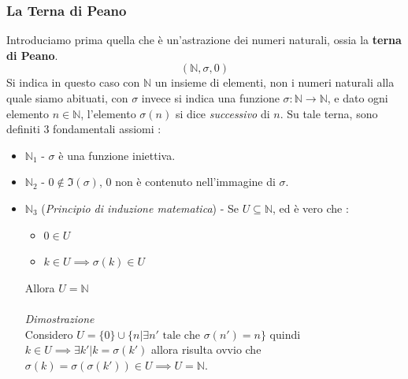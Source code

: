 \documentclass[12pt, letterpaper]{article}
\begin{document}
\subsubsection{La Terna di Peano}
Introduciamo prima quella che è un'astrazione dei numeri naturali, ossia la \textbf{terna di Peano}. 
\begin{equation}
    (\mathbb{N} ,\sigma ,0)
\end{equation}
Si indica in questo caso con \(\mathbb{N}\) un insieme di elementi, non i numeri naturali alla quale siamo abituati,
con \(\sigma\) invece si indica una funzione \(\sigma : \mathbb{N}\rightarrow\mathbb{N}\),
e dato ogni elemento \(n\in \mathbb{N}\), l'elemento \(\sigma(n)\) si dice \textit{successivo} di \(n\).  Su tale terna, sono definiti 
3 fondamentali assiomi : 
\begin{itemize}
    \item \(\mathbb{N}_1\) - \(\sigma\) è una funzione iniettiva.
    \item \(\mathbb{N}_2\) - \(0 \notin \Im(\sigma)\), 0 non è contenuto nell'immagine di \(\sigma\).
    \item \(\mathbb{N}_3\) (\textit{Principio di induzione matematica}) - Se \(U\subseteq\mathbb{N}\), ed è vero che :
    \begin{itemize}
        \item\(0\in U\)
        \item\(k\in U \implies \sigma(k)\in U\)
    \end{itemize}
    Allora \(U=\mathbb{N}\)
    \\\hphantom{.}\\\textit{Dimostrazione}\\
    Considero \(U=\{0\}\cup\{n|\exists n' \text{ tale che }\sigma(n')=n\}\) quindi \(k\in U \implies \exists k' | k=\sigma(k')\)
     allora risulta ovvio che \(\sigma(k)=\sigma(\sigma(k')) \in U \implies U = \mathbb{N} \).
\end{itemize}
\end{document}
